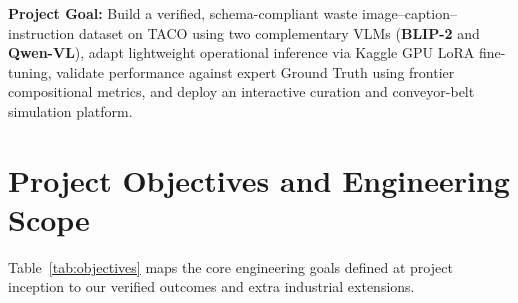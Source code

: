 \documentclass[11pt,a4paper]{article}
\begin{document}
\textbf{Project Goal:} Build a verified, schema-compliant waste image--caption--instruction dataset on TACO using two complementary VLMs (\textbf{BLIP-2} and \textbf{Qwen-VL}), adapt lightweight operational inference via Kaggle GPU LoRA fine-tuning, validate performance against expert Ground Truth using frontier compositional metrics, and deploy an interactive curation and conveyor-belt simulation platform.

\section{Project Objectives and Engineering Scope}

Table~\ref{tab:objectives} maps the core engineering goals defined at project inception to our verified outcomes and extra industrial extensions.
\end{document}
